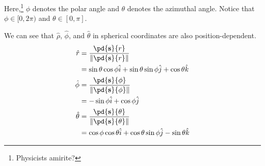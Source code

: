 \documentclass[10pt]{mypackage}
\begin{document}
Here,\footnote{Physicists amirite?} $\phi$ denotes the polar angle and $\theta$ denotes the azimuthal angle. Notice that $\phi \in [0,2\pi)$ and $\theta \in [0,\pi]$.\newline

We can see that $\hat\rho$, $\hat\phi$, and $\hat\theta$ in spherical coordinates are also position-dependent.
\begin{align*}
  \hat r &= \frac{\pd{\mathbf{s}}{r}}{\norm{\pd{\mathbf{s}}{r}}}\\
         &= \sin\theta\cos\phi\hat{i} + \sin\theta\sin\phi\hat{j} + \cos\theta\hat{k}\\
  \hat{\phi} &= \frac{\pd{\mathbf{s}}{\phi}}{\norm{\pd{\mathbf{s}}{\phi}}}\\
             &= -\sin\phi\hat{i} + \cos\phi\hat{j}\\
  \hat{\theta} &= \frac{\pd{\mathbf{s}}{\theta}}{\norm{\pd{\mathbf{s}}{\theta}}}\\
               &= \cos\phi\cos\theta\hat{i} + \cos\theta\sin\phi\hat{j} - \sin\theta\hat{k}
\end{align*}
\end{document}
